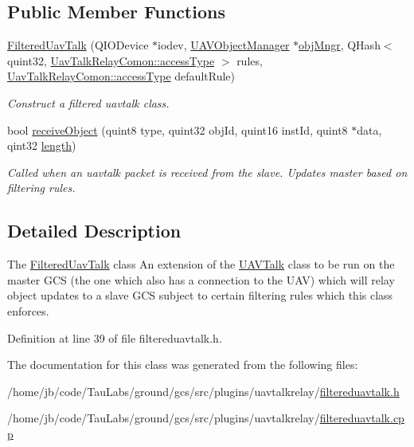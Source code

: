 \subsection*{\-Public \-Member \-Functions}
\begin{DoxyCompactItemize}
\item 
\hyperlink{group___u_a_v_talk_ga618403abe72042a54b38faa22c1c5e5f}{\-Filtered\-Uav\-Talk} (\-Q\-I\-O\-Device $\ast$iodev, \hyperlink{class_u_a_v_object_manager}{\-U\-A\-V\-Object\-Manager} $\ast$\hyperlink{group___u_a_v_talk_plugin_ga096422f1ff46ea45de07a92c41827aa5}{obj\-Mngr}, \-Q\-Hash$<$ quint32, \hyperlink{group___u_a_v_talk_plugin_gae73e1677650d617d825cf2224fa0626a}{\-Uav\-Talk\-Relay\-Comon\-::access\-Type} $>$ rules, \hyperlink{group___u_a_v_talk_plugin_gae73e1677650d617d825cf2224fa0626a}{\-Uav\-Talk\-Relay\-Comon\-::access\-Type} default\-Rule)
\begin{DoxyCompactList}\small\item\em \-Construct a filtered uavtalk class. \end{DoxyCompactList}\item 
bool \hyperlink{group___u_a_v_talk_gae0a55c71a396a0577dd48dad6188a7a0}{receive\-Object} (quint8 type, quint32 obj\-Id, quint16 inst\-Id, quint8 $\ast$data, qint32 \hyperlink{uavobjecttemplate_8m_a076bf56c9bafa07f3dbda4901a40d84c}{length})
\begin{DoxyCompactList}\small\item\em \-Called when an uavtalk packet is received from the slave. \-Updates master based on filtering rules. \end{DoxyCompactList}\end{DoxyCompactItemize}


\subsection{\-Detailed \-Description}
\-The \hyperlink{class_filtered_uav_talk}{\-Filtered\-Uav\-Talk} class \-An extension of the \hyperlink{class_u_a_v_talk}{\-U\-A\-V\-Talk} class to be run on the master \-G\-C\-S (the one which also has a connection to the \-U\-A\-V) which will relay object updates to a slave \-G\-C\-S subject to certain filtering rules which this class enforces. 

\-Definition at line 39 of file filtereduavtalk.\-h.



\-The documentation for this class was generated from the following files\-:\begin{DoxyCompactItemize}
\item 
/home/jb/code/\-Tau\-Labs/ground/gcs/src/plugins/uavtalkrelay/\hyperlink{filtereduavtalk_8h}{filtereduavtalk.\-h}\item 
/home/jb/code/\-Tau\-Labs/ground/gcs/src/plugins/uavtalkrelay/\hyperlink{filtereduavtalk_8cpp}{filtereduavtalk.\-cpp}\end{DoxyCompactItemize}
